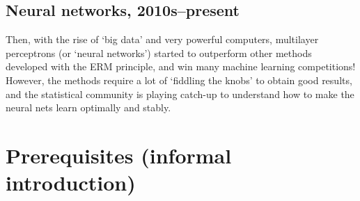 \documentclass{article}
\begin{document}
\subsection{Neural networks, 2010s--present}
Then, with the rise of `big data' and very powerful computers, multilayer perceptrons (or `neural networks') started to outperform other methods developed with the ERM principle, and win many machine learning competitions! However, the methods require a lot of `fiddling the knobs' to obtain good results, and the statistical community is playing catch-up to understand how to make the neural nets learn optimally and stably.

\newpage

\section{Prerequisites (informal introduction)}
\end{document}
